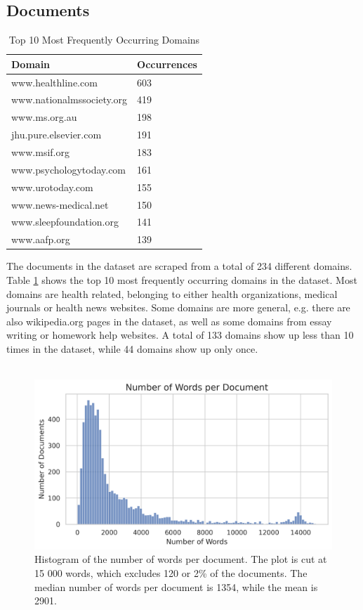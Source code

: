\subsection{Documents}
\begin{table}[tb]
\centering
\begin{tabular}{ll}
\hline
\textbf{Domain} & \textbf{Occurrences} \\
\hline
www.healthline.com & 603 \\
www.nationalmssociety.org & 419 \\
www.ms.org.au & 198 \\
jhu.pure.elsevier.com & 191 \\
www.msif.org & 183 \\
www.psychologytoday.com & 161 \\
www.urotoday.com & 155 \\
www.news-medical.net & 150 \\
www.sleepfoundation.org & 141 \\
www.aafp.org & 139 \\
\hline
\end{tabular}
\caption{Top 10 Most Frequently Occurring Domains}
\label{tab:top_domains}
\end{table}
The documents in the dataset are scraped from a total of 234 different domains.
Table \ref{tab:top_domains} shows the top 10 most frequently occurring domains in the dataset.
Most domains are health related, belonging to either health organizations, medical journals or health news websites.
Some domains are more general, e.g. there are also wikipedia.org pages in the dataset, as well as some domains from essay writing or homework help websites.
A total of 133 domains show up less than 10 times in the dataset, while 44 domains show up only once.
\\\\
\begin{figure}[tb]
\centering
\includegraphics[width=\textwidth]{images/num_words_per_passage.png}
\caption{Histogram of the number of words per document. The plot is cut at 15 000 words, which excludes 120 or 2\% of the documents. The median number of words per document is 1354, while the mean is 2901.}
\label{fig:num_words_per_document}
\end{figure}

